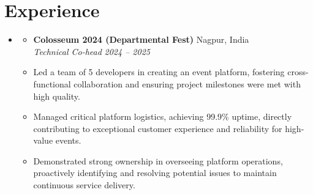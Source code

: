 \documentclass[letterpaper,11pt]{article}
\newcommand{\resumeItem}[1]{
  \item\small{
    {#1 \vspace{-2pt}}
  }
}
\newcommand{\resumeSubheading}[4]{
  \vspace{-1pt}\item
    \begin{itemize}[leftmargin=0in, label={}]
      \item
      \textbf{#1} \hfill #2 \\
      \textit{\small#3} \hfill \textit{\small #4} \\
    \end{itemize}\vspace{-6pt}
}
\newcommand{\resumeSubHeadingListStart}{\begin{itemize}[leftmargin=0.15in, label={}, itemsep=-1pt]}
\newcommand{\resumeSubHeadingListEnd}{\end{itemize}}
\newcommand{\resumeItemListStart}{\begin{itemize}[itemsep=0pt]}
\newcommand{\resumeItemListEnd}{\end{itemize}\vspace{-5pt}}
\begin{document}
\section{Experience}
  \resumeSubHeadingListStart
    \resumeSubheading
      {Colosseum 2024 (Departmental Fest)}{Nagpur, India}
      {Technical Co-head}{2024 -- 2025}
      \resumeItemListStart
        \resumeItem{Led a team of 5 developers in creating an event platform, fostering cross-functional collaboration and ensuring project milestones were met with high quality.}\resumeItem{Managed critical platform logistics, achieving 99.9\% uptime, directly contributing to exceptional customer experience and reliability for high-value events.}\resumeItem{Demonstrated strong ownership in overseeing platform operations, proactively identifying and resolving potential issues to maintain continuous service delivery.}
      \resumeItemListEnd
  \resumeSubHeadingListEnd

\end{document}
